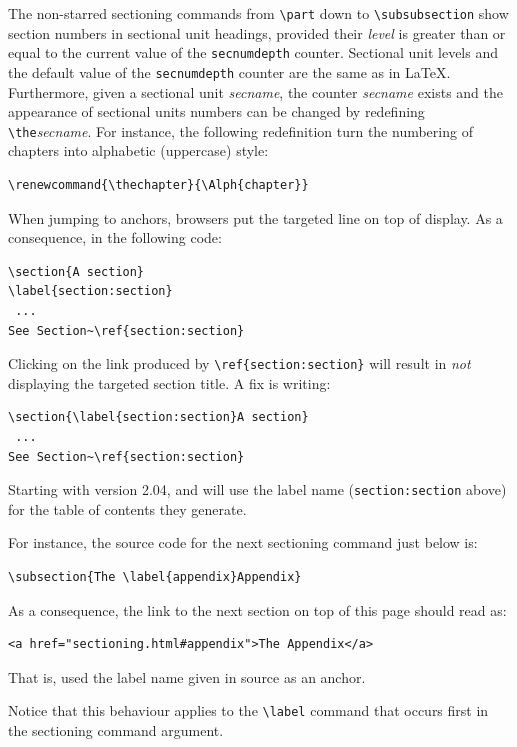 The non-starred sectioning commands from \verb+\part+ down to
\verb+\subsubsection+ show section numbers in sectional unit headings,
provided their \textit{level} is greater than or equal to the current
value of the \verb+secnumdepth+ counter.
Sectional unit levels and the default value of the \verb+secnumdepth+ counter
are the same as in \LaTeX{}.
Furthermore, given a sectional unit {\it secname}, the
counter {\it secname} exists and the appearance of sectional units
numbers can be changed by redefining \verb+\the+{\it secname}.
For instance, the following redefinition turn the numbering of
chapters into alphabetic (uppercase) style:
\begin{verbatim}
\renewcommand{\thechapter}{\Alph{chapter}}
\end{verbatim}

%
When jumping to anchors, browsers put the targeted line on top
of display. As a consequence, in the following code:
\begin{verbatim}
\section{A section}
\label{section:section}
 ...
See Section~\ref{section:section}
\end{verbatim}
Clicking on the link produced by
\verb"\ref{section:section}" will result in \emph{not} displaying the
targeted section title.
A fix is writing:
\begin{verbatim}
\section{\label{section:section}A section}
 ...
See Section~\ref{section:section}
\end{verbatim}

Starting with version 2.04, \hevea{} and \hacha{} will use the label name
(\verb+section:section+ above) for the table of  contents they generate.
\begin{htmlonly}
For instance, the source code for the next sectioning command just
below is:
\begin{verbatim}
\subsection{The \label{appendix}Appendix}
\end{verbatim}
As a consequence, the link to the next section on top
of this page should read as:
\begin{verbatim}
<a href="sectioning.html#appendix">The Appendix</a>
\end{verbatim}
That is, \hevea{} used the label name given in source as
an anchor.
\end{htmlonly}
Notice that this behaviour applies to the \verb+\label+ command
that occurs first in the sectioning command argument.

